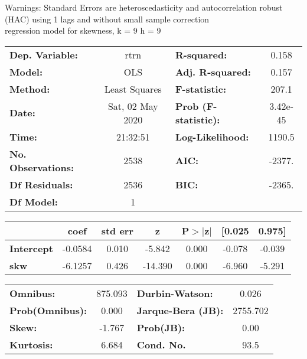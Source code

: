 Warnings: \newline
 [1] Standard Errors are heteroscedasticity and autocorrelation robust (HAC) using 1 lags and without small sample correction\\ 

regression model for skewness, k = 9 h = 9\begin{center}
\begin{tabular}{lclc}
\toprule
\textbf{Dep. Variable:}    &       rtrn       & \textbf{  R-squared:         } &     0.158   \\
\textbf{Model:}            &       OLS        & \textbf{  Adj. R-squared:    } &     0.157   \\
\textbf{Method:}           &  Least Squares   & \textbf{  F-statistic:       } &     207.1   \\
\textbf{Date:}             & Sat, 02 May 2020 & \textbf{  Prob (F-statistic):} &  3.42e-45   \\
\textbf{Time:}             &     21:32:51     & \textbf{  Log-Likelihood:    } &    1190.5   \\
\textbf{No. Observations:} &        2538      & \textbf{  AIC:               } &    -2377.   \\
\textbf{Df Residuals:}     &        2536      & \textbf{  BIC:               } &    -2365.   \\
\textbf{Df Model:}         &           1      & \textbf{                     } &             \\
\bottomrule
\end{tabular}
\begin{tabular}{lcccccc}
                   & \textbf{coef} & \textbf{std err} & \textbf{z} & \textbf{P$> |$z$|$} & \textbf{[0.025} & \textbf{0.975]}  \\
\midrule
\textbf{Intercept} &      -0.0584  &        0.010     &    -5.842  &         0.000        &       -0.078    &       -0.039     \\
\textbf{skw}       &      -6.1257  &        0.426     &   -14.390  &         0.000        &       -6.960    &       -5.291     \\
\bottomrule
\end{tabular}
\begin{tabular}{lclc}
\textbf{Omnibus:}       & 875.093 & \textbf{  Durbin-Watson:     } &    0.026  \\
\textbf{Prob(Omnibus):} &   0.000 & \textbf{  Jarque-Bera (JB):  } & 2755.702  \\
\textbf{Skew:}          &  -1.767 & \textbf{  Prob(JB):          } &     0.00  \\
\textbf{Kurtosis:}      &   6.684 & \textbf{  Cond. No.          } &     93.5  \\
\bottomrule
\end{tabular}
\end{center}

